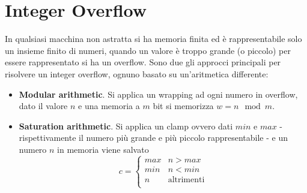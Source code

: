 \documentclass[Lau,binding=0.6cm]{sapthesis}
\begin{document}

\section{Integer Overflow} \label{sec:integer_overflow}
In qualsiasi macchina non astratta si ha memoria finita ed è rappresentabile solo un insieme finito di numeri, quando un valore è troppo grande (o piccolo) per essere rappresentato si ha un overflow. Sono due gli approcci principali per risolvere un integer overflow, ognuno basato su un'aritmetica differente:
\begin{itemize}
    \item \textbf{Modular arithmetic}. Si applica un wrapping ad ogni numero in overflow, dato il valore $n$ e una memoria a $m$ bit si memorizza $w = n \mod m$.
    \item \textbf{Saturation arithmetic}. Si applica un clamp ovvero dati $min$ e $max$ - rispettivamente il numero più grande e più piccolo rappresentabile - e un numero $n$ in memoria viene salvato
    \begin{equation*}
        c = \begin{cases}
            max & n > max \\
            min & n < min \\
            n  & \text{altrimenti} \\
        \end{cases}
    \end{equation*}
\end{itemize}
\end{document}
